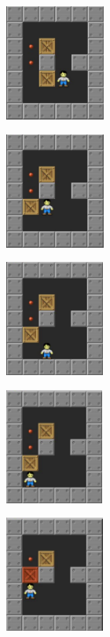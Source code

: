 \documentclass[10pt, final]{article}
\begin{document}
		\begin{figure}[h!]
			{
				\begin{subfigure}[h!]{1.3in}
					\includegraphics[height=1.5in]{r6.png}
				\end{subfigure}
				\begin{subfigure}[h!]{1.3in}
					\includegraphics[height=1.5in]{r7.png}
				\end{subfigure}
				\begin{subfigure}[h!]{1.3in}
					\includegraphics[height=1.5in]{r8.png}
				\end{subfigure}
				\begin{subfigure}[h!]{1.3in}
					\includegraphics[height=1.5in]{r9.png}
				\end{subfigure}
				\begin{subfigure}[h!]{1.3in}
					\includegraphics[height=1.5in]{r10.png}
			\end{subfigure}}
			\label{fig:chain}
		\end{figure}
\end{document}
